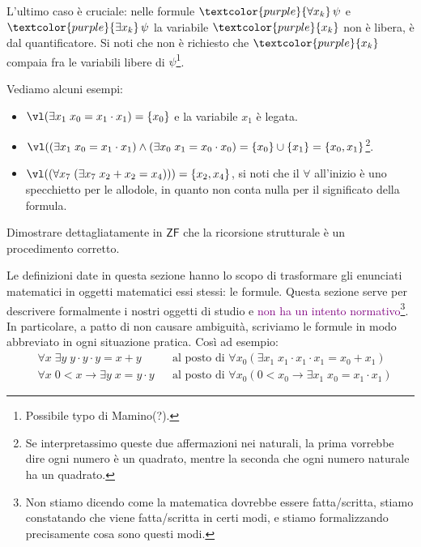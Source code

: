 \begin{remark}
    L'ultimo caso è cruciale: nelle formule $\textcolor{purple}{\forall x_k} \, \psi$ e $\textcolor{purple}{\exists x_k} \, \psi$ la variabile $\textcolor{purple}{x_k}$ non è libera, è  dal quantificatore.
    Si noti che non è richiesto che $\textcolor{purple}{x_k}$ compaia fra le variabili libere di $\psi$\footnote{Possibile typo di Mamino(?).}.
\end{remark}

\begin{example}
    Vediamo alcuni esempi:
    \begin{itemize}[$\diamondsuit$]
        \item $\vl(\exists x_1 \; x_0 = x_1 \cdot x_1) = \{x_0\}$ e la variabile $x_1$ è legata.
        \item $\vl((\exists x_1 \; x_0 = x_1 \cdot x_1) \land (\exists x_0 \; x_1 = x_0 \cdot x_0) = \{x_0\} \cup \{x_1\} = \{x_0,x_1\}$\footnote{Se interpretassimo queste due affermazioni nei naturali, la prima vorrebbe dire ogni numero è un quadrato, mentre la seconda che ogni numero naturale ha un quadrato.}.
        \item $\vl((\forall x_7 \; (\exists x_7 \; x_2 + x_2 = x_4))) = \{x_2,x_4\}$, si noti che il $\forall$ all'inizio è uno specchietto per le allodole, in quanto non conta nulla per il significato della formula.
    \end{itemize}
\end{example}

\begin{exercise}
    Dimostrare dettagliatamente in $\mathsf{ZF}$ che la ricorsione strutturale è un procedimento corretto.
\end{exercise}

\begin{note}
    Le definizioni date in questa sezione hanno lo scopo di trasformare gli enunciati matematici in oggetti matematici essi stessi: le formule.
    Questa sezione serve per descrivere formalmente i nostri oggetti di studio e \textcolor{purple}{non ha un intento normativo}\footnote{Non stiamo dicendo come 
    la matematica dovrebbe essere fatta/scritta, stiamo constatando che viene fatta/scritta in certi modi, e stiamo formalizzando precisamente cosa sono questi modi.}.
    In particolare, a patto di non causare ambiguità, scriviamo le formule in modo abbreviato in ogni situazione pratica. Così ad esempio:
    \begin{align*}
        &\forall x\; \exists y \; y \cdot y \cdot y = x + y &&\text{al posto di  $\forall x_0(\exists x_1 \; x_1 \cdot x_1 \cdot x_1 = x_0 + x_1)$} \\
        &\forall x\; 0 < x \to \exists y \; x = y \cdot y &&\text{al posto di $\forall x_0(0 < x_0 \to \exists x_1 \; x_0 = x_1 \cdot x_1)$}
    \end{align*}
\end{note}

